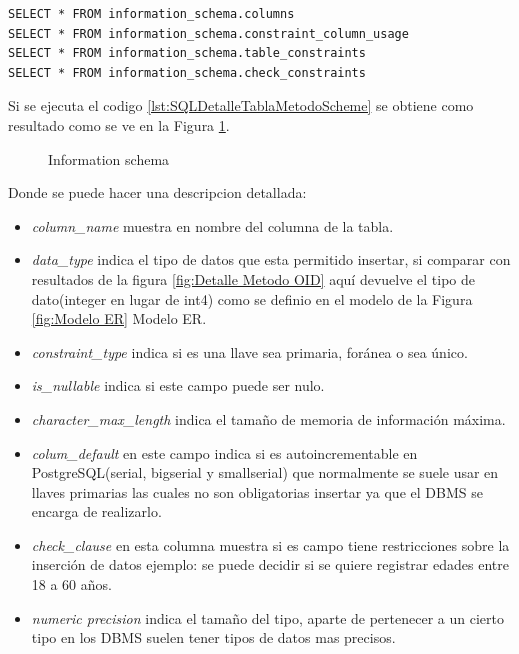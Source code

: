 \lstset{language=sql,breaklines=true}
\begin{lstlisting}
SELECT * FROM information_schema.columns
SELECT * FROM information_schema.constraint_column_usage
SELECT * FROM information_schema.table_constraints
SELECT * FROM information_schema.check_constraints
\end{lstlisting}
Si se ejecuta el codigo \ref{lst:SQLDetalleTablaMetodoScheme} se obtiene como resultado como se ve en la Figura \ref{fig:DetalleMetodoScheme}.

\begin{figure}[H]
\centering
{}
\caption{Information schema} \label{fig:DetalleMetodoScheme}
\end{figure}
Donde se puede hacer una descripcion detallada:
\begin{itemize}
\item \emph{column\_name} muestra en nombre del columna de la tabla.
\item \emph{data\_type} indica el tipo de datos que esta permitido insertar, si comparar con resultados de la figura \ref{fig:Detalle Metodo OID} aqu\'i devuelve el tipo de dato(integer en lugar de int4) como se definio en el modelo de la Figura \ref{fig:Modelo ER} Modelo ER.
\item \emph{constraint\_type} indica si es una llave sea primaria, for\'anea o sea \'unico.
\item \emph{is\_nullable} indica si este campo puede ser nulo.
\item \emph{character\_max\_length} indica el tama\~no de memoria de informaci\'on m\'axima.
\item \emph{colum\_default} en este campo indica si es autoincrementable en PostgreSQL(serial, bigserial y smallserial) que normalmente se suele usar en llaves primarias las cuales no son obligatorias insertar ya que el DBMS se encarga de realizarlo.
\item \emph{check\_clause} en esta columna muestra si es campo tiene restricciones sobre la inserci\'on de datos ejemplo: se puede decidir si se quiere registrar edades entre 18 a 60 a\~nos. 
\item \emph{numeric precision} indica el tama\~no del tipo, aparte de pertenecer a un cierto tipo en los DBMS suelen tener tipos de datos mas precisos.  
\end{itemize}
